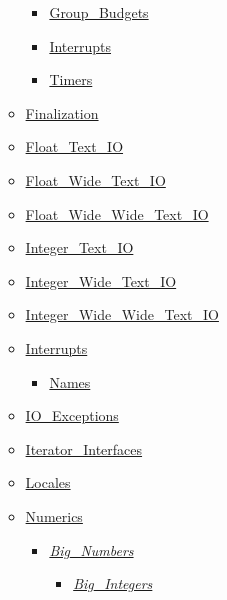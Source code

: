 \documentclass[english]{article}
\begin{document}
\begin{scriptsize}
\begin{multicols*}{5}
\begin{itemize}[leftmargin=0mm]
\begin{itemize}[leftmargin=5mm]
\begin{itemize}[leftmargin=5mm]
	\item[] \href{http://www.ada-auth.org/standards/22rm/html/RM-D-14-2.html}{Group\_Budgets}
	\item[] \href{http://www.ada-auth.org/standards/22rm/html/RM-D-14-3.html}{Interrupts}
	\item[] \href{http://www.ada-auth.org/standards/22rm/html/RM-D-14-1.html}{Timers}
	\end{itemize}
  \item[] \href{http://www.ada-auth.org/standards/22rm/html/RM-7-6.html}{Finalization}
  \item[] \href{http://www.ada-auth.org/standards/22rm/html/RM-A-10-9.html}{Float\_Text\_IO}
  \item[] \href{http://www.ada-auth.org/standards/22rm/html/RM-A-11.html}{Float\_Wide\_Text\_IO}
  \item[] \href{http://www.ada-auth.org/standards/22rm/html/RM-A-11.html}{Float\_Wide\_Wide\_Text\_IO}
  \item[] \href{http://www.ada-auth.org/standards/22rm/html/RM-A-10-8.html}{Integer\_Text\_IO}
  \item[] \href{http://www.ada-auth.org/standards/22rm/html/RM-A-11.html}{Integer\_Wide\_Text\_IO}
  \item[] \href{http://www.ada-auth.org/standards/22rm/html/RM-A-11.html}{Integer\_Wide\_Wide\_Text\_IO}
  \item[] \href{http://www.ada-auth.org/standards/22rm/html/RM-C-3-2.html}{Interrupts}
	\begin{itemize}[leftmargin=5mm]
	\item[] \href{http://www.ada-auth.org/standards/22rm/html/RM-C-3-2.html}{Names}
	\end{itemize}
  \item[] \href{http://www.ada-auth.org/standards/22rm/html/RM-A-13.html}{IO\_Exceptions}
  \item[] \href{http://www.ada-auth.org/standards/22rm/html/RM-5-5-1.html}{Iterator\_Interfaces}
  \item[] \href{http://www.ada-auth.org/standards/22rm/html/RM-A-19.html}{Locales}
  \item[] \href{http://www.ada-auth.org/standards/22rm/html/RM-A-5.html}{Numerics}
	\begin{itemize}[leftmargin=5mm]
	\item[] \href{http://www.ada-auth.org/standards/22rm/html/RM-A-5-5.html}{\textit{Big\_Numbers}}
	  \begin{itemize}[leftmargin=5mm]
	  \item[] \href{http://www.ada-auth.org/standards/22rm/html/RM-A-5-6.html}{\textit{Big\_Integers}}

\end{itemize}
\end{itemize}
\end{itemize}
\end{itemize}
\end{multicols*}
\end{scriptsize}
\end{document}
